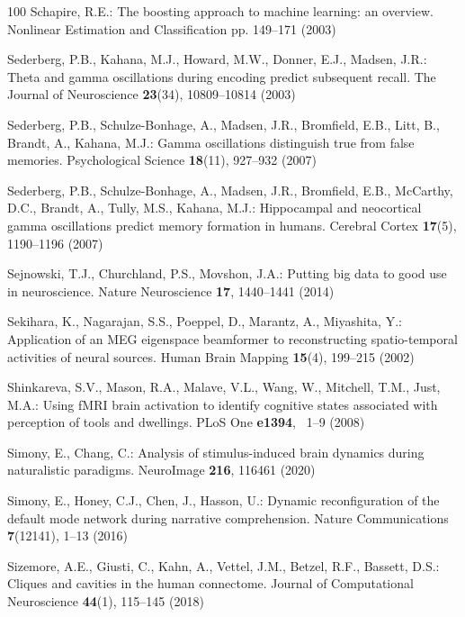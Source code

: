 \documentclass[runningheads]{llncs}
\begin{document}
\begin{thebibliography}{100}
Schapire, R.E.: The boosting approach to machine learning: an overview.
  Nonlinear Estimation and Classification pp. 149--171 (2003)

Sederberg, P.B., Kahana, M.J., Howard, M.W., Donner, E.J., Madsen, J.R.: Theta
  and gamma oscillations during encoding predict subsequent recall. The Journal
  of Neuroscience  \textbf{23}(34),  10809--10814 (2003)

Sederberg, P.B., Schulze-Bonhage, A., Madsen, J.R., Bromfield, E.B., Litt, B.,
  Brandt, A., Kahana, M.J.: Gamma oscillations distinguish true from false
  memories. Psychological Science  \textbf{18}(11),  927--932 (2007)

Sederberg, P.B., Schulze-Bonhage, A., Madsen, J.R., Bromfield, E.B., McCarthy,
  D.C., Brandt, A., Tully, M.S., Kahana, M.J.: Hippocampal and neocortical
  gamma oscillations predict memory formation in humans. Cerebral Cortex
  \textbf{17}(5),  1190--1196 (2007)

Sejnowski, T.J., Churchland, P.S., Movshon, J.A.: Putting big data to good use
  in neuroscience. Nature Neuroscience  \textbf{17},  1440--1441 (2014)

Sekihara, K., Nagarajan, S.S., Poeppel, D., Marantz, A., Miyashita, Y.:
  Application of an {MEG} eigenspace beamformer to reconstructing
  spatio-temporal activities of neural sources. Human Brain Mapping
  \textbf{15}(4),  199--215 (2002)

Shinkareva, S.V., Mason, R.A., Malave, V.L., Wang, W., Mitchell, T.M., Just,
  M.A.: Using {fMRI} brain activation to identify cognitive states associated
  with perception of tools and dwellings. {PLoS} One  \textbf{e1394}, ~1--9
  (2008)

Simony, E., Chang, C.: Analysis of stimulus-induced brain dynamics during
  naturalistic paradigms. {NeuroImage}  \textbf{216},  116461 (2020)

Simony, E., Honey, C.J., Chen, J., Hasson, U.: Dynamic reconfiguration of the
  default mode network during narrative comprehension. Nature Communications
  \textbf{7}(12141),  1--13 (2016)

Sizemore, A.E., Giusti, C., Kahn, A., Vettel, J.M., Betzel, R.F., Bassett,
  D.S.: Cliques and cavities in the human connectome. Journal of Computational
  Neuroscience  \textbf{44}(1),  115--145 (2018)


\end{thebibliography}
\end{document}

